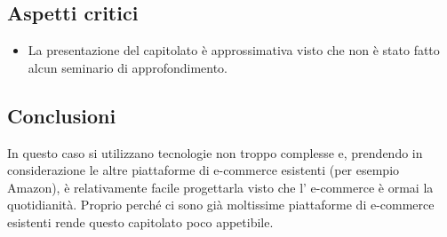 \subsection{Aspetti critici}
\begin{itemize}
\item	La presentazione del capitolato è approssimativa visto che non è stato fatto alcun seminario di approfondimento.
\end{itemize}
\subsection{Conclusioni}
In questo caso si utilizzano tecnologie non troppo complesse e, prendendo in considerazione le altre piattaforme di e-commerce esistenti (per esempio Amazon), è relativamente facile progettarla visto che l' e-commerce è ormai la quotidianità. Proprio perché ci sono già moltissime piattaforme di e-commerce esistenti rende questo capitolato poco appetibile.

